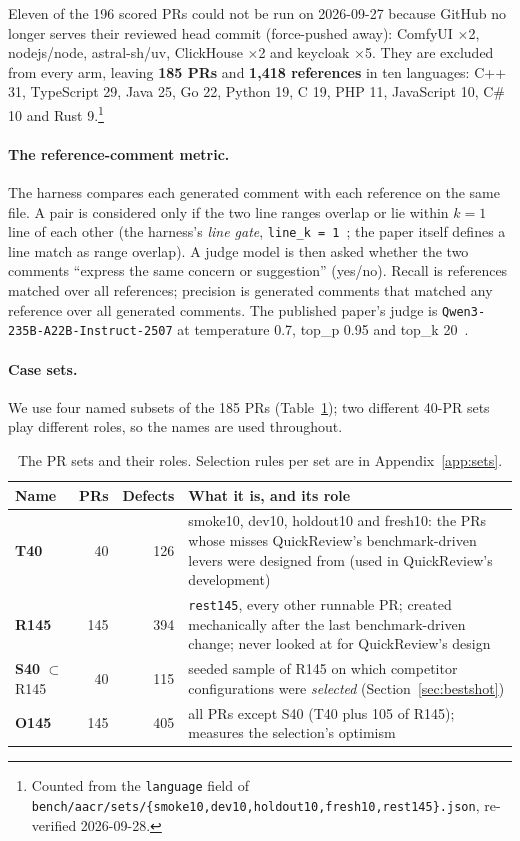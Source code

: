 \documentclass[11pt,a4paper]{article}
\newcommand{\qcr}{QuickReview}
\newcommand{\code}[1]{\texttt{#1}}
\begin{document}
Eleven of the 196 scored PRs could not be run on 2026-09-27 because GitHub
no longer serves their reviewed head commit (force-pushed away): ComfyUI
$\times$2, nodejs/node, astral-sh/uv, ClickHouse $\times$2 and keycloak
$\times$5. They are excluded from every arm, leaving \textbf{185 PRs} and
\textbf{1{,}418 references} in ten languages: C++ 31, TypeScript 29, Java
25, Go 22, Python 19, C 19, PHP 11, JavaScript 10, C\# 10 and Rust
9.\footnote{Counted from the \code{language} field of
\code{bench/aacr/sets/\{smoke10,dev10,holdout10,fresh10,rest145\}.json},
re-verified 2026-09-28.}

\paragraph{The reference-comment metric.} The harness compares each
generated comment with each reference on the same file. A pair is
considered only if the two line ranges overlap or lie within $k=1$ line of
each other (the harness's \emph{line gate}, \code{line\_k = 1}~\cite{aacrrepo};
the paper itself defines a line match as range overlap). A judge model is
then asked whether the two comments ``express the same concern or
suggestion'' (yes/no). Recall is references matched over all references;
precision is generated comments that matched any reference over all
generated comments. The published paper's judge is
\code{Qwen3-235B-A22B-Instruct-2507} at temperature 0.7, top\_p 0.95 and
top\_k 20~\cite{aacrbench}.

\paragraph{Case sets.} We use four named subsets of the 185 PRs
(Table~\ref{tab:setnames}); two different 40-PR sets play different roles, so
the names are used throughout.

\begin{table}[tbp]
  \centering
  \small
  \caption{The PR sets and their roles. Selection rules per set are in
  Appendix~\ref{app:sets}.}
  \label{tab:setnames}
  \begin{tabularx}{\textwidth}{l r r X}
    \toprule
    Name & PRs & Defects & What it is, and its role \\
    \midrule
    \textbf{T40} & 40 & 126 & smoke10, dev10, holdout10 and fresh10: the PRs whose misses \qcr{}'s benchmark-driven levers were designed from (used in \qcr{}'s development) \\
    \textbf{R145} & 145 & 394 & \code{rest145}, every other runnable PR; created mechanically after the last benchmark-driven change; never looked at for \qcr{}'s design \\
    \textbf{S40} $\subset$ R145 & 40 & 115 & seeded sample of R145 on which competitor configurations were \emph{selected} (Section~\ref{sec:bestshot}) \\
    \textbf{O145} & 145 & 405 & all PRs except S40 (T40 plus 105 of R145); measures the selection's optimism \\
    \bottomrule
  \end{tabularx}
\end{table}
\end{document}
